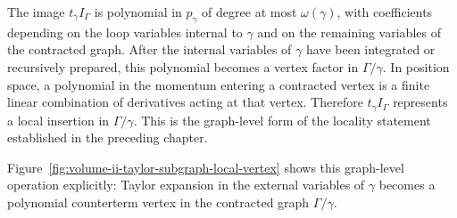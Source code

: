 The image \(t_\gamma I_\Gamma\) is polynomial in \(p_\gamma\) of degree at most
\(\omega(\gamma)\), with coefficients depending on the loop variables internal
to \(\gamma\) and on the remaining variables of the contracted graph.  After
the internal variables of \(\gamma\) have been integrated or recursively
prepared, this polynomial becomes a vertex factor in \(\Gamma/\gamma\).  In
position space, a polynomial in the momentum entering a contracted vertex is a
finite linear combination of derivatives acting at that vertex.  Therefore
\(t_\gamma I_\Gamma\) represents a local insertion in \(\Gamma/\gamma\).  This
is the graph-level form of the locality statement established in the preceding
chapter.

Figure~\ref{fig:volume-ii-taylor-subgraph-local-vertex} shows this graph-level
operation explicitly: Taylor expansion in the external variables of
\(\gamma\) becomes a polynomial counterterm vertex in the contracted graph
\(\Gamma/\gamma\).

